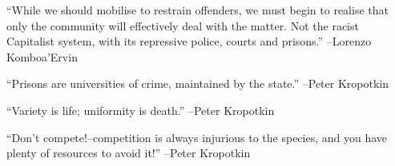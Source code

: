 \documentclass{article}%
\begin{document}
\linebreak%
\vspace{1mm}%
\begin{minipage}{\textwidth}%
\flushleft%
“While we should mobilise to restrain offenders, we must begin to realise that only the community will effectively deal with the matter. Not the racist Capitalist system, with its repressive police, courts and prisons.”%
\linebreak%
\vspace{1mm}%
–Lorenzo Komboa'Ervin%
\linebreak%
\vspace{1mm}%
\end{minipage}%
\linebreak%
\vspace{1mm}%
\begin{minipage}{\textwidth}%
\flushleft%
“Prisons are universities of crime, maintained by the state.”%
\linebreak%
\vspace{1mm}%
–Peter Kropotkin%
\linebreak%
\vspace{1mm}%
\end{minipage}%
\linebreak%
\vspace{1mm}%
\begin{minipage}{\textwidth}%
\flushleft%
“Variety is life; uniformity is death.”%
\linebreak%
\vspace{1mm}%
–Peter Kropotkin%
\linebreak%
\vspace{1mm}%
\end{minipage}%
\linebreak%
\vspace{1mm}%
\begin{minipage}{\textwidth}%
\flushleft%
“Don't compete!–competition is always injurious to the species, and you have plenty of resources to avoid it!”%
\linebreak%
\vspace{1mm}%
–Peter Kropotkin%
\linebreak%
\vspace{1mm}%
\end{minipage}%
\linebreak%
\vspace{1mm}%
\end{document}
